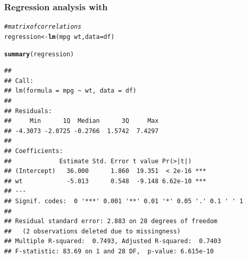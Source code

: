 \documentclass[12pt]{beamer}\usepackage[]{graphicx}\usepackage[]{color}
\makeatletter
\newcommand{\hlnum}[1]{\textcolor[rgb]{0.686,0.059,0.569}{#1}}%
\newcommand{\hlcom}[1]{\textcolor[rgb]{0.678,0.584,0.686}{\textit{#1}}}%
\newcommand{\hlopt}[1]{\textcolor[rgb]{0,0,0}{#1}}%
\newcommand{\hlstd}[1]{\textcolor[rgb]{0.345,0.345,0.345}{#1}}%
\newcommand{\hlkwb}[1]{\textcolor[rgb]{0.69,0.353,0.396}{#1}}%
\newcommand{\hlkwc}[1]{\textcolor[rgb]{0.333,0.667,0.333}{#1}}%
\newcommand{\hlkwd}[1]{\textcolor[rgb]{0.737,0.353,0.396}{\textbf{#1}}}%
\newenvironment{kframe}{%
 \def\at@end@of@kframe{}%
 \ifinner\ifhmode%
  \def\at@end@of@kframe{\end{minipage}}%
  \begin{minipage}{\columnwidth}%
 \fi\fi%
 \def\FrameCommand##1{\hskip\@totalleftmargin \hskip-\fboxsep
 \colorbox{shadecolor}{##1}\hskip-\fboxsep
     \hskip-\linewidth \hskip-\@totalleftmargin \hskip\columnwidth}%
 \MakeFramed {\advance\hsize-\width
   \@totalleftmargin\z@ \linewidth\hsize
   \@setminipage}}%
 {\par\unskip\endMakeFramed%
 \at@end@of@kframe}
\newenvironment{knitrout}{}{} %
\makeatother
\begin{document}

\begin{frame}[fragile]
\frametitle{Regression analysis with }

\begin{knitrout}\scriptsize
{}\color{fgcolor}\begin{kframe}
\begin{alltt}
\hlcom{# matrix of correlations}
\hlstd{regression} \hlkwb{<-} \hlkwd{lm}\hlstd{(mpg} \hlopt{~} \hlstd{wt,} \hlkwc{data} \hlstd{= df)}

\hlkwd{summary}\hlstd{(regression)}
\end{alltt}
\begin{verbatim}
## 
## Call:
## lm(formula = mpg ~ wt, data = df)
## 
## Residuals:
##     Min      1Q  Median      3Q     Max 
## -4.3073 -2.0725 -0.2766  1.5742  7.4297 
## 
## Coefficients:
##             Estimate Std. Error t value Pr(>|t|)    
## (Intercept)   36.000      1.860  19.351  < 2e-16 ***
## wt            -5.013      0.548  -9.148 6.62e-10 ***
## ---
## Signif. codes:  0 '***' 0.001 '**' 0.01 '*' 0.05 '.' 0.1 ' ' 1
## 
## Residual standard error: 2.883 on 28 degrees of freedom
##   (2 observations deleted due to missingness)
## Multiple R-squared:  0.7493,	Adjusted R-squared:  0.7403 
## F-statistic: 83.69 on 1 and 28 DF,  p-value: 6.615e-10
\end{verbatim}
\end{kframe}
\end{knitrout}

\end{frame}


\end{document}
